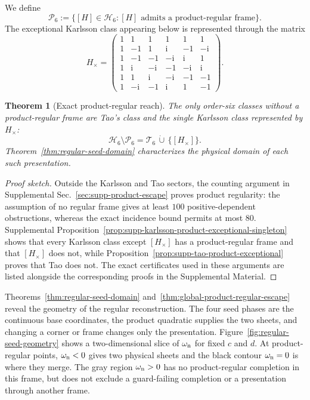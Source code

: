 \documentclass[aps,prx,reprint,nofootinbib,twoside,superscriptaddress,longbibliography,floatfix]{revtex4-2}
\newtheorem{theorem}{Theorem}
\theoremstyle{definition}
\newcommand{\I}{\mathrm i}
\newcommand{\HH}{\mathcal H}
\begin{document}
We define
\begin{equation}
\mathcal P_6:=\{[H]\in\HH_6:\text{$[H]$ admits a product-regular frame}\}.
\label{eq:main-product-regular-class-locus}
\end{equation}
The exceptional Karlsson class appearing below is represented through the matrix
\begin{equation}
H_\times=
\begin{pmatrix}
1&1&1&1&1&1\\
1&-1&1&\I&-1&-\I\\
1&-1&-1&-\I&\I&1\\
1&\I&-\I&-1&-\I&\I\\
1&1&\I&-\I&-1&-1\\
1&-\I&-1&\I&1&-1
\end{pmatrix}.
\label{eq:main-product-exceptional-karlsson-matrix}
\end{equation}

\begin{theorem}[Exact product-regular reach]
\label{thm:atlas-main}
\label{thm:global-product-regular-escape}
The only order-six classes without a product-regular frame are Tao's class
and the single Karlsson class represented by $H_\times$:
\begin{equation}
\HH_6\setminus\mathcal P_6
=\mathcal T_6\,\dot\cup\,\{[H_\times]\}.
\label{eq:global-product-regular-reach}
\end{equation}
Theorem~\ref{thm:regular-seed-domain} characterizes the physical domain of
each such presentation.
\end{theorem}

\begin{proof}[Proof sketch]
Outside the Karlsson and Tao sectors, the counting argument in Supplemental
Sec.~\ref{sec:supp-product-escape} proves product regularity: the assumption
of no regular frame gives at least $100$ positive-dependent obstructions,
whereas the exact incidence bound permits at most $80$.
Supplemental Proposition~\ref{prop:supp-karlsson-product-exceptional-singleton}
shows that every Karlsson class except $[H_\times]$ has a product-regular
frame and that $[H_\times]$ does not, while
Proposition~\ref{prop:supp-tao-product-exceptional} proves that Tao does not.
The exact certificates used in these arguments are listed alongside the
corresponding proofs in the Supplemental Material.
\end{proof}

Theorems~\ref{thm:regular-seed-domain} and~\ref{thm:global-product-regular-escape} reveal the geometry of the regular reconstruction. The four seed phases are the continuous base coordinates, the product quadratic supplies the two sheets, and changing a corner or frame changes only the presentation. Figure~\ref{fig:regular-seed-geometry} shows a two-dimensional slice of $\omega_{\rm n}$ for fixed $c$ and $d$. At product-regular points, $\omega_{\rm n}<0$ gives two physical sheets and the black contour $\omega_{\rm n}=0$ is where they merge. The gray region $\omega_{\rm n}>0$ has no product-regular completion in this frame, but does not exclude a guard-failing completion or a presentation through another frame.
\end{document}
